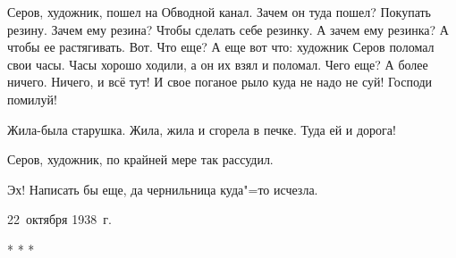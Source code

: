 
Серов, художник, пошел на Обводной канал. Зачем он туда пошел? Покупать резину. Зачем ему резина? Чтобы сделать себе резинку. А зачем ему резинка? А чтобы ее растягивать. Вот. Что еще? А еще вот что: художник Серов поломал свои часы. Часы хорошо ходили, а он их взял и поломал. Чего еще? А более ничего. Ничего, и всё тут! И свое поганое рыло куда не надо не суй! Господи помилуй!

Жила-была старушка. Жила, жила и сгорела в печке. Туда ей и дорога!

Серов, художник, по крайней мере так рассудил.

Эх! Написать бы еще, да чернильница куда"=то исчезла.

\begin{flushright}
22~октября 1938~г.
\end{flushright}

\begin{center}
* * *
\end{center}